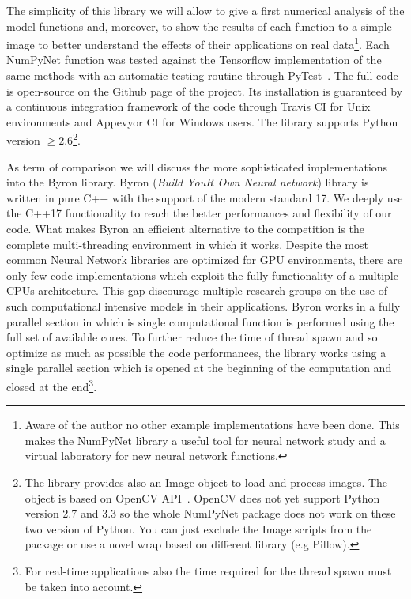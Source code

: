 \documentclass{standalone}
\begin{document}
The simplicity of this library we will allow to give a first numerical analysis of the model functions and, moreover, to show the results of each function to a simple image to better understand the effects of their applications on real data\footnote{
  Aware of the author no other example implementations have been done.
  This makes the \textsf{NumPyNet} library a useful tool for neural network study and a virtual laboratory for new neural network functions.
}.
Each \textsf{NumPyNet} function was tested against the \textsf{Tensorflow} implementation of the same methods with an automatic testing routine through \textsf{PyTest}~\cite{Okken:2017:PTP:3176124}.
The full code is open-source on the \textsf{Github} page of the project.
Its installation is guaranteed by a continuous integration framework of the code through \textsf{Travis CI} for Unix environments and \textsf{Appevyor CI} for Windows users.
The library supports \textsf{Python} version $\ge2.6$\footnote{
  The library provides also an \textsf{Image} object to load and process images.
  The object is based on OpenCV API~\cite{OpenCV}.
  \textsf{OpenCV} does not yet support \textsf{Python} version 2.7 and 3.3 so the whole \textsf{NumPyNet} package does not work on these two version of \textsf{Python}.
  You can just exclude the \textsf{Image} scripts from the package or use a novel wrap based on different library (e.g \textsf{Pillow}).
}.

As term of comparison we will discuss the more sophisticated implementations into the \textsf{Byron} library.
\textsf{Byron} (\emph{Build YouR Own Neural network}) library is written in pure \textsf{C++} with the support of the modern standard 17.
We deeply use the \textsf{C++17} functionality to reach the better performances and flexibility of our code.
What makes \textsf{Byron} an efficient alternative to the competition is the complete multi-threading environment in which it works.
Despite the most common Neural Network libraries are optimized for GPU environments, there are only few code implementations which exploit the fully functionality of a multiple CPUs architecture.
This gap discourage multiple research groups on the use of such computational intensive models in their applications.
\textsf{Byron} works in a fully parallel section in which is single computational function is performed using the full set of available cores.
To further reduce the time of thread spawn and so optimize as much as possible the code performances, the library works using a single parallel section which is opened at the beginning of the computation and closed at the end\footnote{
  For real-time applications also the time required for the thread spawn must be taken into account.
}.
\end{document}
